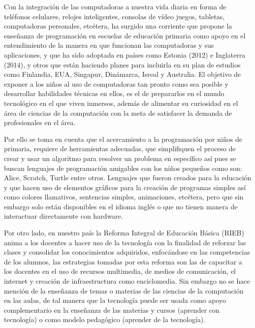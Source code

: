 \documentclass[letterpaper,10pt]{article}
\begin{document}
Con la integración de las computadoras a nuestra vida diaria en forma de teléfonos celulares,
 relojes inteligentes, consolas de vídeo juegos, tabletas, computadoras personales, 
 etcétera, ha surgido una corriente 
que propone la enseñanza de programación en escuelas de educación primaria como apoyo
en el entendimiento de la manera en que funcionan las computadoras y sus aplicaciones, y que ha
sido adoptada en países como Estonia (2012) e Inglaterra (2014), y otros que están 
haciendo planes para incluirla en su plan de estudios como 
Finlandia, EUA, Singapur, Dinámarca, Isreal y Australia. El objetivo de exponer a los niños
al uso de computadoras tan pronto como sea posible y desarrollar habilidades técnicas en ellos,
es el de prepararlos en el mundo tecnológico en el que viven inmersos, además
 de alimentar su curiosidad en el área de ciencias de la computación con la meta de 
 satisfacer la demanda de profesionales en el área.\newline 

Por ello se toma en cuenta que el acercamiento a la programación por niños de primaria, 
requiere de herramientas adecuadas,
que simplifiquen el proceso de crear y usar un algoritmo para resolver un problema en específico 
así pues se buscan lenguajes de programación amigables con los niños pequeños como son:
Alice, Scratch, Turtle entre otros. Lenguajes que fueron creados para la educación y que 
hacen uso de elementos gráficos para la creación de programas simples así como colores llamativos,
sentencias simples, animaciones, etcétera, pero que sin embargo solo están disponibles en el
idioma inglés o que no tienen manera de interactuar directamente con hardware.\newline

Por otro lado, en nuestro país la Reforma Integral de Educación Básica (RIEB) anima
a los docentes a hacer uso de
la tecnología con la finalidad de reforzar las clases y consolidar los conocimientos adquiridos,
enfocándose en las competencias de los alumnos, las estrategias tomadas por esta reforma son las
de capacitar a los docentes en el uso de recursos multimedia, de medios de comunicación, 
el internet y creación de infraestructura como enciclomedia. Sin embargo no se hace mención 
de la enseñanza de temas o materias de las ciencias de la computación en las aulas, 
de tal manera que la 
tecnología puede ser usada como apoyo complementario en la enseñanza de las materias y cursos 
(aprender con tecnología) o como modelo pedagógico (aprender de la tecnología).\newline
\end{document}
